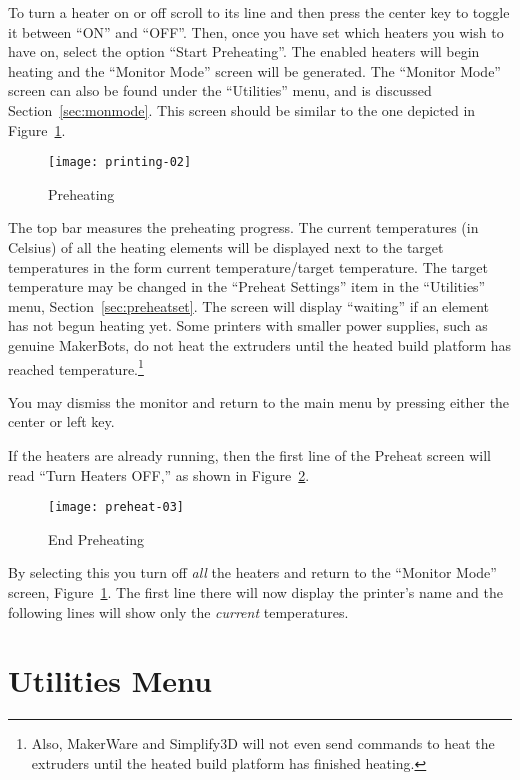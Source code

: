 To turn a heater on or off scroll to its line and then press the center key to toggle it between ``ON'' and ``OFF''.  Then, once you have set which heaters you wish to have on, select the option ``Start Preheating''.  The enabled heaters will begin heating and the ``Monitor Mode'' screen will be generated.  The ``Monitor Mode'' screen can also be found under the ``Utilities'' menu, and is discussed Section~\ref{sec:monmode}.  This screen should be similar to the one depicted in Figure~\ref{fig:heat}.

\begin{figure}[!htbp]
  \centering
    \texttt{[image: printing-02]}
    \caption{Preheating}
  \label{fig:heat}
\end{figure}

The top bar measures the preheating progress.  The current temperatures (in Celsius) of all the heating elements will be displayed next to the target temperatures in the form current temperature/target temperature.  The target temperature may be changed in the ``Preheat Settings'' item in the ``Utilities'' menu, Section~\ref{sec:preheatset}.  The screen will display ``waiting'' if an element has not begun heating yet.  Some printers with smaller power supplies, such as genuine MakerBots, do not heat the extruders until the heated build platform has reached temperature.\footnote{Also, MakerWare and Simplify3D will not even send commands to heat the extruders until the heated build platform has finished heating.}

You may dismiss the monitor and return to the main menu by pressing either the center or left key.

If the heaters are already running, then the first line of the Preheat screen will read ``Turn Heaters OFF,'' as shown in Figure~\ref{fig:endheat}.

\begin{figure}[!htbp]
  \centering
    \texttt{[image: preheat-03]}
    \caption{End Preheating}
  \label{fig:endheat}
\end{figure}

By selecting this you turn off \emph{all} the heaters and return to the ``Monitor Mode'' screen, Figure~\ref{fig:heat}.  The first line there will now display the printer's name and the following lines will show only the \emph{current} temperatures.  %


\section{Utilities Menu}\label{sec:utilities}

